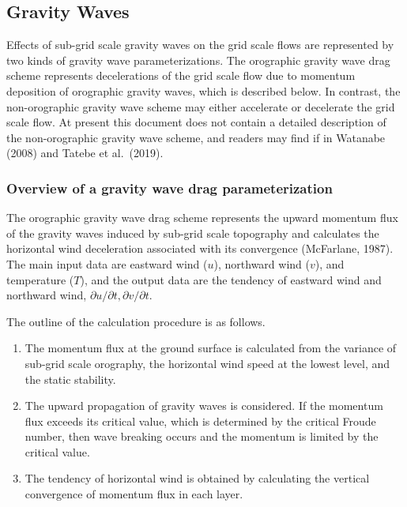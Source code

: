 \hypertarget{gravity-waves}{%
\subsection{Gravity Waves}\label{gravity-waves}}

Effects of sub-grid scale gravity waves on the grid scale flows are
represented by two kinds of gravity wave parameterizations. The
orographic gravity wave drag scheme represents decelerations of the grid
scale flow due to momentum deposition of orographic gravity waves, which
is described below. In contrast, the non-orographic gravity wave scheme
may either accelerate or decelerate the grid scale flow. At present this
document does not contain a detailed description of the non-orographic
gravity wave scheme, and readers may find if in Watanabe (2008) and
Tatebe et al.~(2019).

\hypertarget{overview-of-a-gravity-wave-drag-parameterization}{%
\subsubsection{Overview of a gravity wave drag
parameterization}\label{overview-of-a-gravity-wave-drag-parameterization}}

The orographic gravity wave drag scheme represents the upward momentum
flux of the gravity waves induced by sub-grid scale topography and
calculates the horizontal wind deceleration associated with its
convergence (McFarlane, 1987). The main input data are eastward wind
(\(u\)), northward wind (\(v\)), and temperature (\(T\)), and the output
data are the tendency of eastward wind and northward wind,
\(\partial u/\partial t, \partial v/\partial t\).

The outline of the calculation procedure is as follows.

\begin{enumerate}
\def\labelenumi{\arabic{enumi}.}
\item
  The momentum flux at the ground surface is calculated from the
  variance of sub-grid scale orography, the horizontal wind speed at the
  lowest level, and the static stability.
\item
  The upward propagation of gravity waves is considered. If the momentum
  flux exceeds its critical value, which is determined by the critical
  Froude number, then wave breaking occurs and the momentum is limited
  by the critical value.
\item
  The tendency of horizontal wind is obtained by calculating the
  vertical convergence of momentum flux in each layer.
\end{enumerate}

